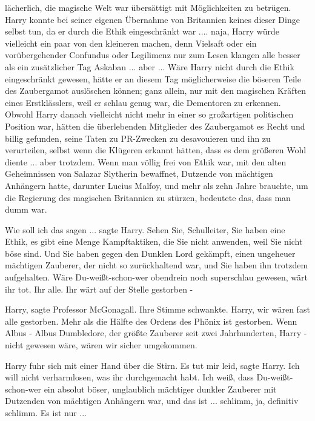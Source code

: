 lächerlich, die magische Welt war übersättigt mit Möglichkeiten zu betrügen.
Harry konnte bei seiner eigenen Übernahme von Britannien keines dieser Dinge
selbst tun, da er durch die Ethik eingeschränkt war .... naja, Harry würde
vielleicht ein paar von den kleineren machen, denn Vielsaft oder ein
vorübergehender Confundus oder Legilimenz nur zum Lesen klangen alle besser als
ein zusätzlicher Tag Askaban ... aber ... Wäre Harry nicht durch die Ethik
eingeschränkt gewesen, hätte er an diesem Tag möglicherweise die böseren Teile
des Zaubergamot auslöschen können; ganz allein, nur mit den magischen Kräften
eines Erstklässlers, weil er schlau genug war, die Dementoren zu erkennen.
Obwohl Harry danach vielleicht nicht mehr in einer so großartigen politischen
Position war, hätten die überlebenden Mitglieder des Zaubergamot es Recht und
billig gefunden, seine Taten zu PR-Zwecken zu desavouieren und ihn zu
verurteilen, selbst wenn die Klügeren erkannt hätten, dass es dem größeren Wohl
diente ... aber trotzdem. Wenn man völlig frei von Ethik war, mit den alten
Geheimnissen von Salazar Slytherin bewaffnet, Dutzende von mächtigen Anhängern
hatte, darunter Lucius Malfoy, und mehr als zehn Jahre brauchte, um die
Regierung des magischen Britannien zu stürzen, bedeutete das, dass man dumm war.

\glqq{}Wie soll ich das sagen ...\grqq{} sagte Harry. \glqq{}Sehen Sie,
Schulleiter, Sie haben eine Ethik, es gibt eine Menge Kampftaktiken, die Sie
nicht anwenden, weil Sie nicht böse sind. Und Sie haben gegen den Dunklen Lord
gekämpft, einen ungeheuer mächtigen Zauberer, der nicht so zurückhaltend war,
und Sie haben ihn trotzdem aufgehalten. Wäre Du-weißt-schon-wer obendrein noch
superschlau gewesen, wärt ihr tot. Ihr alle. Ihr wärt auf der Stelle gestorben
-\grqq{}

\glqq{}Harry\grqq{}, sagte Professor McGonagall. Ihre Stimme schwankte. \glqq{}
Harry, wir wären fast alle gestorben. Mehr als die Hälfte des Ordens des Phönix
ist gestorben. Wenn Albus - Albus Dumbledore, der größte Zauberer seit zwei
Jahrhunderten, Harry - nicht gewesen wäre, wären wir sicher umgekommen.\grqq{}

Harry fuhr sich mit einer Hand über die Stirn. \glqq{}Es tut mir leid\grqq{},
sagte Harry. \glqq{}Ich will nicht verharmlosen, was ihr durchgemacht habt. Ich
weiß, dass Du-weißt-schon-wer ein absolut böser, unglaublich mächtiger dunkler
Zauberer mit Dutzenden von mächtigen Anhängern war, und das ist ... schlimm, ja,
definitiv schlimm. Es ist nur ...\grqq{}

